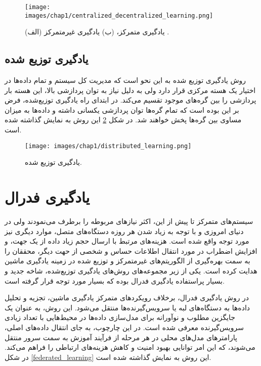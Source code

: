 \begin{figure}[b]
	\centering
	\texttt{[image: images/chap1/centralized\_decentralized\_learning.png]}%
	\caption{%
		(الف) یادگیری متمرکز، (ب) یادگیری غیرمتمرکز
		\cite{zhou2019edge}%
		.
	}
	\label{centralized_decentralized_learning}
	\centering
\end{figure}


\subsection{یادگیری توزیع شده}
روش یادگیری توزیع شده%
به این نحو است که مدیریت کل سیستم و تمام داده‌ها در اختیار یک هسته مرکزی قرار دارد ولی به دلیل نیاز به توان پردازشی بالا، این هسته بار پردازشی را بین گره‌های موجود تقسیم می‌کند. در ابتدای راه یادگیری توزیع‌شده، فرض بر این بوده است که تمام گره‌ها توان پردازشی یکسانی داشته و داده‌ها به میزان مساوی بین گره‌ها پخش خواهند شد. در شکل
\ref{distributed_learning}
این روش به نمایش گذاشته شده است.


\begin{figure}[t]
	\centering
	\texttt{[image: images/chap1/distributed\_learning.png]}%
	\caption{%
		یادگیری توزیع شده.
	}
	\label{distributed_learning}
	\centering
\end{figure}

\section{یادگیری فدرال}
سیستم‌های متمرکز تا پیش از این، اکثر نیازهای مربوطه را برطرف می‌نمودند ولی در دنیای امروزی و با توجه به زیاد شدن هر روزه دستگاه‌های متصل، موارد دیگری نیز مورد توجه واقع شده است.
هزینه‌های مرتبط با ارسال حجم زیاد داده از یک جهت، و افزایش اضطراب در مورد انتقال اطلاعات حساس و شخصی از حهت دیگر، محققان را به سمت بهره‌گیری از الگوریتم‌های غیرمتمرکز و توزیع شده در زمینه یادگیری ماشین هدایت کرده است.
یکی از زیر مجموعه‌های روش‌های یادگیری توزیع‌شده، شاخه جدید و بسیار پراستفاده یادگیری فدرال بوده که بسیار مورد توجه قرار گرفته است.

در روش یادگیری فدرال، برخلاف رویکردهای متمرکز یادگیری ماشین، تجزیه و تحلیل داده‌ها به دستگاه‌های لبه%
یا سرویس‌گیرنده‌ها%
منتقل می‌شود. این روش، به عنوان یک جایگزین مطلوب و نوآورانه برای مدل‌سازی داده‌ها در محیط‌هایی با تعداد زیادی سرویس‌گیرنده معرفی شده است. در این چارچوب، به جای انتقال داده‌های اصلی، پارامترهای مدل‌های محلی در هر مرحله از فرآیند آموزش به سمت سرور منتقل می‌شوند، که این امر توانایی بهبود امنیت و کاهش هزینه‌های ارتباطی را فراهم می‌کند.
در شکل
\ref{federated_learning}
این روش به نمایش گذاشته شده است.


